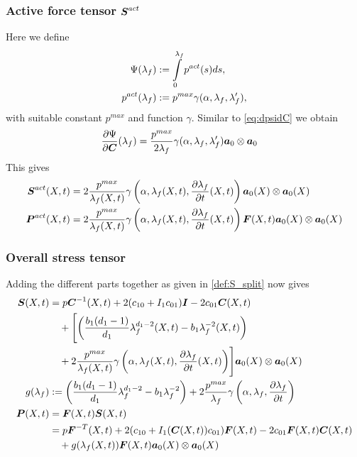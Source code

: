\subsubsection{Active force tensor $\boldsymbol{S}^{act}$}
Here we define
\begin{align*}
	\Psi(\lambda_f) &:= \int\limits_{0}^{\lambda_f} p^{act}(s)ds,\\
	p^{act}(\lambda_f) &:= p^{max}\gamma(\alpha,\lambda_f,\lambda_f'),
\end{align*}
with suitable constant $p^{max}$ and function $\gamma$.
Similar to \eqref{eq:dpsidC} we obtain
\begin{align}
	\frac{\partial \Psi}{\partial \boldsymbol{C}}(\lambda_f) &= \frac{p^{max}}{2\lambda_f}\gamma(\alpha,\lambda_f,\lambda_f')\boldsymbol{a}_0\otimes\boldsymbol{a}_0
\end{align}
This gives
\begin{align}
	\boldsymbol{S}^{act}(X,t) &= 2\frac{p^{max}}{\lambda_f(X,t)}\gamma\left(\alpha,\lambda_f(X,t),\frac{\partial \lambda_f}{\partial t}(X,t)\right)\boldsymbol{a}_0(X)\otimes\boldsymbol{a}_0(X)\\
	\boldsymbol{P}^{act}(X,t) &= 2\frac{p^{max}}{\lambda_f(X,t)}\gamma\left(\alpha,\lambda_f(X,t),\frac{\partial \lambda_f}{\partial t}(X,t)\right)\boldsymbol{F}(X,t)\boldsymbol{a}_0(X)\otimes\boldsymbol{a}_0(X)
\end{align}

\subsubsection{Overall stress tensor}
Adding the different parts together as given in \eqref{def:S_split} now gives
\begin{align}
	\boldsymbol{S}(X,t) &= p\boldsymbol{C}^{-1}(X,t) + 2(c_{10} + I_1c_{01})\boldsymbol{I} - 2c_{01}\boldsymbol{C}(X,t)\\
			 &\quad+\Biggl[\left(\frac{b_1(d_1-1)}{d_1}\lambda_f^{d_1-2}(X,t) - b_1\lambda_f^{-2}(X,t)\right)\nonumber\\
			 &\quad+2\frac{p^{max}}{\lambda_f(X,t)}\gamma\left(\alpha,\lambda_f(X,t),\frac{\partial \lambda_f}{\partial t}(X,t)\right)\Biggr]\boldsymbol{a}_0(X)\otimes\boldsymbol{a}_0(X)\nonumber\\
	g(\lambda_f)&:= \left(\frac{b_1(d_1-1)}{d_1}\lambda_f^{d_1-2} - b_1\lambda_f^{-2}\right)
		+2\frac{p^{max}}{\lambda_f}\gamma\left(\alpha,\lambda_f,\frac{\partial \lambda_f}{\partial t}\right)\label{def:g}\\			 
	\boldsymbol{P}(X,t) &= \boldsymbol{F}(X,t)\boldsymbol{S}(X,t)\label{def:completeP}\\
			 &= p\boldsymbol{F}^{-T}(X,t) + 2(c_{10} + I_1(\boldsymbol{C}(X,t))c_{01})\boldsymbol{F}(X,t) - 2c_{01}\boldsymbol{F}(X,t)\boldsymbol{C}(X,t)\nonumber\\
			 &\quad+g(\lambda_f(X,t))\boldsymbol{F}(X,t)\boldsymbol{a}_0(X)\otimes\boldsymbol{a}_0(X)\nonumber
\end{align}

